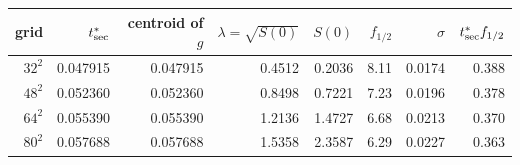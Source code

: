 \begin{tabular}{rrrrrrrr}
\toprule
grid & $t^*_{\rm sec}$ & centroid of $g$ & $\lambda=\sqrt{S(0)}$ & $S(0)$ & $f_{1/2}$ & $\sigma$ & $t^*_{\rm sec}f_{1/2}$ \\
\midrule
$32^2$ & 0.047915 & 0.047915 & 0.4512 & 0.2036 & 8.11 & 0.0174 & 0.388 \\
$48^2$ & 0.052360 & 0.052360 & 0.8498 & 0.7221 & 7.23 & 0.0196 & 0.378 \\
$64^2$ & 0.055390 & 0.055390 & 1.2136 & 1.4727 & 6.68 & 0.0213 & 0.370 \\
$80^2$ & 0.057688 & 0.057688 & 1.5358 & 2.3587 & 6.29 & 0.0227 & 0.363 \\
\bottomrule
\end{tabular}
